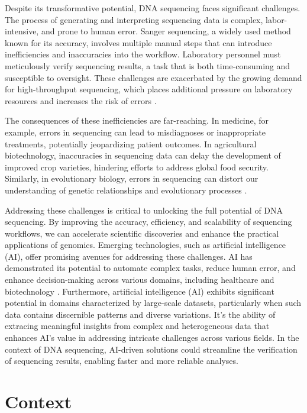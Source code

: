 Despite its transformative potential, DNA sequencing faces significant challenges. The process of generating and interpreting sequencing data is complex, labor-intensive, and prone to human error. Sanger sequencing, a widely used method known for its accuracy, involves multiple manual steps that can introduce inefficiencies and inaccuracies into the workflow. Laboratory personnel must meticulously verify sequencing results, a task that is both time-consuming and susceptible to oversight. These challenges are exacerbated by the growing demand for high-throughput sequencing, which places additional pressure on laboratory resources and increases the risk of errors \cite{chakravarthy2020challenges}.

The consequences of these inefficiencies are far-reaching. In medicine, for example, errors in sequencing can lead to misdiagnoses or inappropriate treatments, potentially jeopardizing patient outcomes. In agricultural biotechnology, inaccuracies in sequencing data can delay the development of improved crop varieties, hindering efforts to address global food security. Similarly, in evolutionary biology, errors in sequencing can distort our understanding of genetic relationships and evolutionary processes \cite{kumar2018sequencing}.

Addressing these challenges is critical to unlocking the full potential of DNA sequencing. By improving the accuracy, efficiency, and scalability of sequencing workflows, we can accelerate scientific discoveries and enhance the practical applications of genomics. Emerging technologies, such as artificial intelligence (AI), offer promising avenues for addressing these challenges. AI has demonstrated its potential to automate complex tasks, reduce human error, and enhance decision-making across various domains, including healthcare and biotechnology \cite{esteva2017dermatologist, senior2020protein}. Furthermore, artificial intelligence (AI) exhibits significant potential in domains characterized by large-scale datasets, particularly when such data contains discernible patterns and diverse variations. It's the ability of extracing meaningful insights from complex and heterogeneous data that enhances AI's value in addressing intricate challenges across various fields. In the context of DNA sequencing, AI-driven solutions could streamline the verification of sequencing results, enabling faster and more reliable analyses.

\section{Context}
\label{sec:Context}

